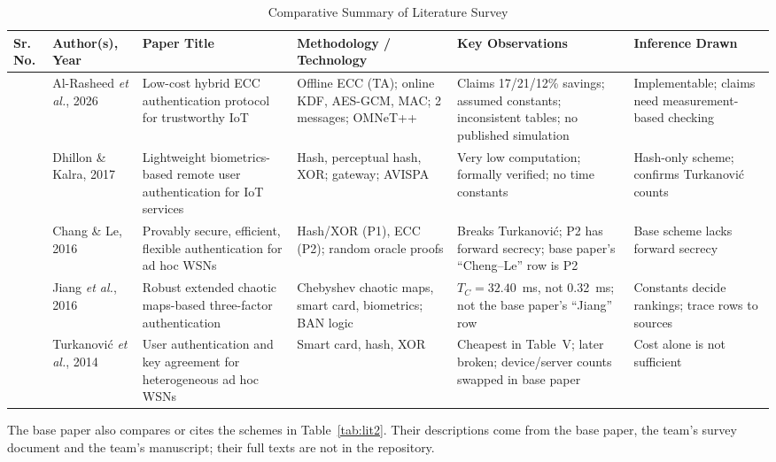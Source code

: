 \documentclass[12pt,a4paper,oneside]{report}
\numberwithin{equation}{chapter}
\begin{document}
\begin{table}[H]
\centering
\caption{Comparative Summary of Literature Survey}
\label{tab:lit}
\small
\begin{tabularx}{\textwidth}{|>{\centering\arraybackslash}p{}|P{0.14\textwidth}|Y|P{0.17\textwidth}|Y|Y|}
\hline
\textbf{Sr. No.} & \textbf{Author(s), Year} & \textbf{Paper Title} & \textbf{Methodology / Technology} & \textbf{Key Observations} & \textbf{Inference Drawn}\\  & Al-Rasheed \emph{et al.}, 2026 & Low-cost hybrid ECC authentication protocol for trustworthy IoT & Offline ECC (TA); online KDF, AES-GCM, MAC; 2 messages; OMNeT++ & Claims 17/21/12\% savings; assumed constants; inconsistent tables; no published simulation & Implementable; claims need measurement-based checking\\  & Dhillon \& Kalra, 2017 & Lightweight biometrics-based remote user authentication for IoT services & Hash, perceptual hash, XOR; gateway; AVISPA & Very low computation; formally verified; no time constants & Hash-only scheme; confirms Turkanovi\'{c} counts\\  & Chang \& Le, 2016 & Provably secure, efficient, flexible authentication for ad hoc WSNs & Hash/XOR (P1), ECC (P2); random oracle proofs & Breaks Turkanovi\'{c}; P2 has forward secrecy; base paper's ``Cheng--Le'' row is P2 & Base scheme lacks forward secrecy\\  & Jiang \emph{et al.}, 2016 & Robust extended chaotic maps-based three-factor authentication & Chebyshev chaotic maps, smart card, biometrics; BAN logic & $T_C = 32.40$~ms, not 0.32~ms; not the base paper's ``Jiang'' row & Constants decide rankings; trace rows to sources\\  & Turkanovi\'{c} \emph{et al.}, 2014 & User authentication and key agreement for heterogeneous ad hoc WSNs & Smart card, hash, XOR & Cheapest in Table~V; later broken; device/server counts swapped in base paper & Cost alone is not sufficient\\ \hline
\end{tabularx}
\end{table}

The base paper also compares or cites the schemes in Table~\ref{tab:lit2}. Their descriptions come from the base paper, the team's survey document and the team's manuscript; their full texts are not in the repository.
\end{document}

